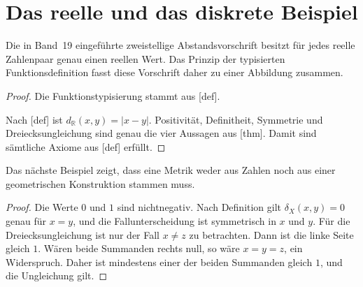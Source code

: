 \documentclass[main.tex]{subfiles}
\begin{document}
\section{Das reelle und das diskrete Beispiel}

Die in Band~19 eingeführte zweistellige Abstandsvorschrift besitzt für jedes
reelle Zahlenpaar genau einen reellen Wert. Das Prinzip der typisierten
Funktionsdefinition fasst diese Vorschrift daher zu einer Abbildung zusammen.


\begin{proof}
Die Funktionstypisierung stammt aus
[def].

Nach
[def] ist
\(d_{\mathbb R}(x,y)=|x-y|\). Positivität, Definitheit, Symmetrie und
Dreiecksungleichung sind genau die vier Aussagen aus
[thm]. Damit sind sämtliche Axiome aus
[def] erfüllt.
\end{proof}

Das nächste Beispiel zeigt, dass eine Metrik weder aus Zahlen noch aus einer
geometrischen Konstruktion stammen muss.


\begin{proof}
Die Werte \(0\) und \(1\) sind nichtnegativ. Nach Definition gilt
\(\delta_X(x,y)=0\) genau für \(x=y\), und die Fallunterscheidung ist
symmetrisch in \(x\) und \(y\). Für die Dreiecksungleichung ist nur der Fall
\(x\neq z\) zu betrachten. Dann ist die linke Seite gleich \(1\). Wären
beide Summanden rechts null, so wäre \(x=y=z\), ein Widerspruch. Daher ist
mindestens einer der beiden Summanden gleich \(1\), und die Ungleichung gilt.
\end{proof}
\end{document}
